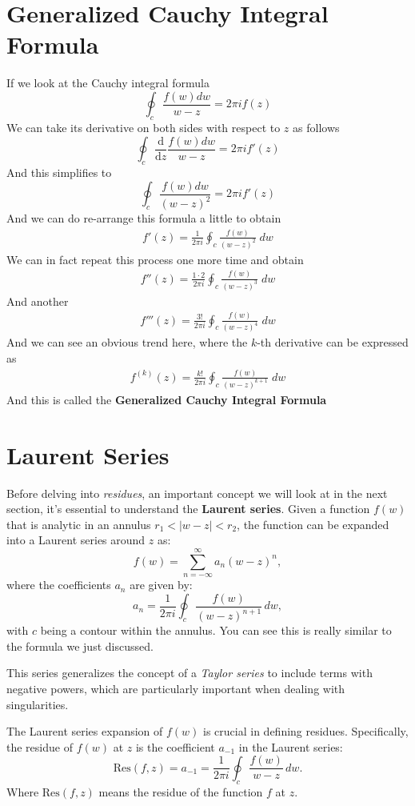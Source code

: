 \documentclass[12pt]{book}
\newcommand{\dydx}[2]{\frac{\text{d} #1}{\text{d} #2}}
\begin{document}
\section{Generalized Cauchy Integral Formula}
If we look at the Cauchy integral formula
\[
\oint_c \frac{f(w)dw}{w-z} = 2\pi i f(z)
\]
We can take its derivative on both sides with respect to $z$ as follows
\[
\oint_c \dydx{}{z} \frac{f(w)dw}{w-z} = 2\pi i f'(z)
\]
And this simplifies to
\[
\oint_c \frac{f(w)dw}{(w-z)^2} = 2 \pi i f'(z)
\]
And we can do re-arrange this formula a little to obtain
\begin{align}
    f'(z) = \frac{1}{2\pi i }\oint_c \frac{f(w)}{(w-z)^2}\;dw
\end{align}
We can in fact repeat this process one more time and obtain
\begin{align}
    f''(z) = \frac{1\cdot 2}{2\pi i}\oint_c \frac{f(w)}{(w-z)^3}\;dw
\end{align}
And another
\begin{align}
    f'''(z) = \frac{3!}{2\pi i} \oint_c \frac{f(w)}{(w-z)^4}\;dw
\end{align}
And we can see an obvious trend here, where the $k$-th derivative can be expressed as
\begin{align}
    f^{(k)}(z) = \frac{k!}{2\pi i}\oint_c \frac{f(w)}{(w-z)^{k+1}}\;dw
\end{align}
And this is called the \textbf{Generalized Cauchy Integral Formula}

\section{Laurent Series}

Before delving into \textit{residues}, an important concept we will look at in the next section, it's essential to understand the \textbf{Laurent series}. Given a function \(f(w)\) that is analytic in an annulus \(r_1 < |w - z| < r_2\), the function can be expanded into a Laurent series around \(z\) as:
\[
f(w) = \sum_{n=-\infty}^{\infty} a_n (w - z)^n,
\]
where the coefficients \(a_n\) are given by:
\[
a_n = \frac{1}{2\pi i} \oint_{c} \frac{f(w)}{(w - z)^{n+1}}\, dw,
\]
with \(c\) being a contour within the annulus. You can see this is really similar to the formula we just discussed.

This series generalizes the concept of a \textit{Taylor series} to include terms with negative powers, which are particularly important when dealing with singularities.


The Laurent series expansion of \(f(w)\) is crucial in defining residues. Specifically, the residue of \(f(w)\) at \(z\) is the coefficient \(a_{-1}\) in the Laurent series:
\[
\text{Res}(f, z) = a_{-1} = \frac{1}{2\pi i} \oint_{c} \frac{f(w)}{w - z} \, dw.
\]
Where $\text{Res}(f,z)$ means the residue of the function $f$ at $z$. 
\end{document}
